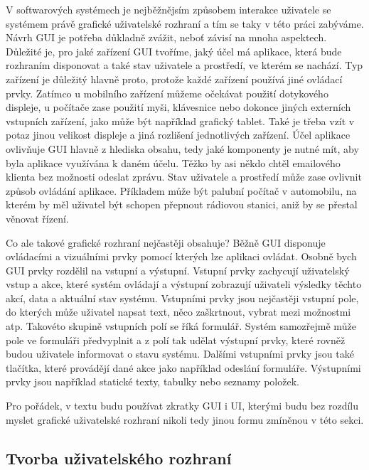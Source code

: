 V softwarových systémech je nejběžnějsím způsobem interakce uživatele se systémem právě grafické uživatelské rozhraní a tím se taky v této práci zabýváme. Návrh GUI je potřeba důkladně zvážit, neboť závisí na mnoha aspektech. Důležité je, pro jaké zařízení GUI tvoříme, jaký účel má aplikace, která bude rozhraním disponovat a také stav uživatele a prostředí, ve kterém se nachází. Typ zařízení je důležitý hlavně proto, protože každé zařízení používá jiné ovládací prvky. Zatímco u mobilního zařízení můžeme očekávat použití dotykového displeje, u počítače zase použití myši, klávesnice nebo dokonce jiných externích vstupních zařízení, jako může být například grafický tablet. Také je třeba vzít v potaz jinou velikost displeje a jiná rozlišení jednotlivých zařízení. Účel aplikace ovlivňuje GUI hlavně z hlediska obsahu, tedy jaké komponenty je nutné mít, aby byla aplikace využívána k daném účelu. Těžko by asi někdo chtěl emailového klienta bez možnosti odeslat zprávu. Stav uživatele a prostředí může zase ovlivnit způsob ovládání aplikace. Příkladem může být palubní počítač v automobilu, na kterém by měl uživatel být schopen přepnout rádiovou stanici, aniž by se přestal věnovat řízení. 

Co ale takové grafické rozhraní nejčastěji obsahuje? Běžně GUI disponuje ovládacími a vizuálními prvky pomocí kterých lze aplikaci ovládat. Osobně bych GUI prvky rozdělil na vstupní a výstupní. Vstupní prvky zachycují uživatelský vstup a akce, které systém ovládají a výstupní zobrazují uživateli výsledky těchto akcí, data a aktuální stav systému. Vstupními prvky jsou nejčastěji vstupní pole, do kterých může uživatel napsat text, něco zaškrtnout, vybrat mezi možnostmi atp. Takovéto skupině vstupních polí se říká formulář. Systém samozřejmě může pole ve formuláři předvyplnit a z polí tak udělat výstupní prvky, které rovněž budou uživatele informovat o stavu systému. Dalšími vstupními prvky jsou také tlačítka, které provádějí dané akce jako například odeslání formuláře. Výstupními prvky jsou například statické texty, tabulky nebo seznamy položek. 

Pro pořádek, v textu budu používat zkratky GUI i UI, kterými budu bez rozdílu myslet grafické uživatelské rozhraní nikoli tedy jinou formu zmíněnou v této sekci.

\subsection{Tvorba uživatelského rozhraní}

